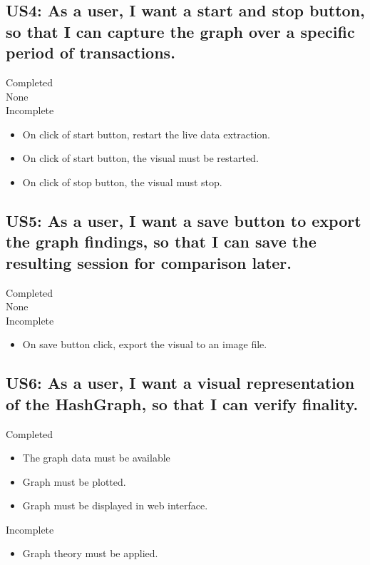 \documentclass[a4paper,10pt]{article}
\begin{document}
\subsection{US4: As a user, I want a start and stop button, so that I can capture the graph over a specific period of transactions.}
Completed\\
None\\
Incomplete
\begin{itemize}
 \item On click of start button, restart the live data extraction.
 \item On click of start button, the visual must be restarted.
 \item On click of stop button, the visual must stop.
\end{itemize}

\subsection{US5: As a user, I want a save button to export the graph findings, so that I can save the resulting session for comparison later.}
Completed\\
None\\
Incomplete
\begin{itemize}
 \item On save button click, export the visual to an image file.
\end{itemize}

\subsection{US6: As a user, I want a visual representation of the HashGraph, so that I can verify finality.}
Completed
\begin{itemize}
 \item The graph data must be available
 \item Graph must be plotted.
 \item Graph must be displayed in web interface.
\end{itemize}
Incomplete
\begin{itemize}
 \item Graph theory must be applied.
\end{itemize}
\end{document}

